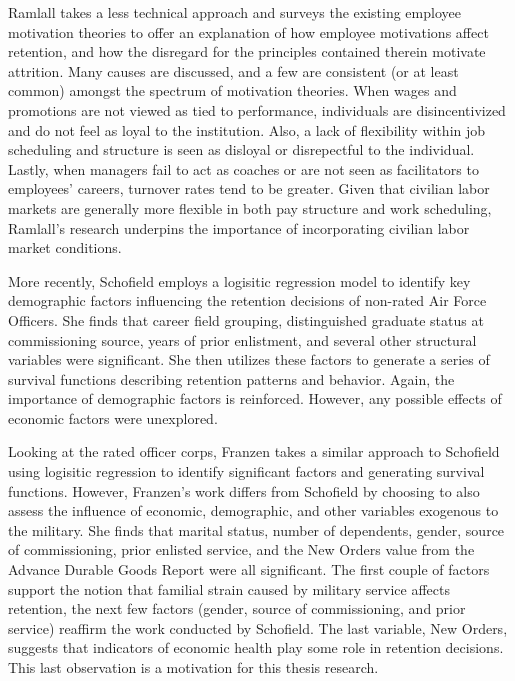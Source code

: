 \documentclass[12pt,letterpaper,toc=flat,oneside]{report}
\theoremstyle{definition}
\theoremstyle{definition}
\theoremstyle{definition}
\theoremstyle{remark}
\begin{document}
Ramlall \cite{ramlall-2004} takes a less technical approach and surveys
the existing employee motivation theories to offer an explanation of how
employee motivations affect retention, and how the disregard for the
principles contained therein motivate attrition. Many causes are
discussed, and a few are consistent (or at least common) amongst the
spectrum of motivation theories. When wages and promotions are not
viewed as tied to performance, individuals are disincentivized and do
not feel as loyal to the institution. Also, a lack of flexibility within
job scheduling and structure is seen as disloyal or disrepectful to the
individual. Lastly, when managers fail to act as coaches or are not seen
as facilitators to employees' careers, turnover rates tend to be
greater. Given that civilian labor markets are generally more flexible
in both pay structure and work scheduling, Ramlall's research underpins
the importance of incorporating civilian labor market conditions.

More recently, Schofield \cite{schofield-2015} employs a logisitic
regression model to identify key demographic factors influencing the
retention decisions of non-rated Air Force Officers. She finds that
career field grouping, distinguished graduate status at commissioning
source, years of prior enlistment, and several other structural
variables were significant. She then utilizes these factors to generate
a series of survival functions describing retention patterns and
behavior. Again, the importance of demographic factors is reinforced.
However, any possible effects of economic factors were unexplored.

Looking at the rated officer corps, Franzen \cite{franzen-2017} takes a
similar approach to Schofield \cite{schofield-2015} using logisitic
regression to identify significant factors and generating survival
functions. However, Franzen's work differs from Schofield by choosing to
also assess the influence of economic, demographic, and other variables
exogenous to the military. She finds that marital status, number of
dependents, gender, source of commissioning, prior enlisted service, and
the New Orders value from the Advance Durable Goods Report were all
significant. The first couple of factors support the notion that
familial strain caused by military service affects retention, the next
few factors (gender, source of commissioning, and prior service)
reaffirm the work conducted by Schofield. The last variable, New Orders,
suggests that indicators of economic health play some role in retention
decisions. This last observation is a motivation for this thesis
research.
\end{document}
